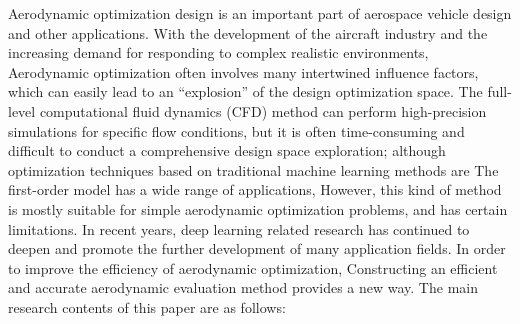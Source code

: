 \begin{eabstract}
Aerodynamic optimization design is an important part of aerospace vehicle design and other applications. With the development of the aircraft industry and the increasing demand for responding to complex realistic environments,
Aerodynamic optimization often involves many intertwined influence factors, which can easily lead to an ``explosion'' of the design optimization space. The full-level computational fluid dynamics (CFD) method can perform high-precision simulations for specific flow conditions, but it is often time-consuming and difficult to conduct a comprehensive design space exploration; although optimization techniques based on traditional machine learning methods are The first-order model has a wide range of applications,
However, this kind of method is mostly suitable for simple aerodynamic optimization problems, and has certain limitations.
In recent years, deep learning related research has continued to deepen and promote the further development of many application fields. In order to improve the efficiency of aerodynamic optimization,
Constructing an efficient and accurate aerodynamic evaluation method provides a new way. The main research contents of this paper are as follows:


\end{eabstract}

